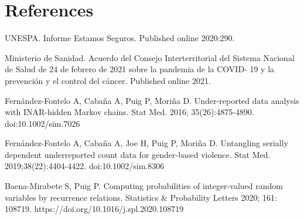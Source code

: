\documentclass[12pt,twoside, A4paper]{article}
\begin{document}


\section*{References}

\begin{description}
\item UNESPA. Informe Estamos Seguros. Published online 2020:290.
\item Ministerio de Sanidad. Acuerdo del Consejo Interterritorial del Sistema
Nacional de Salud de 24 de febrero de 2021 sobre la pandemia de la COVID-
19 y la prevención y el control del cáncer. Published online 2021.
\item Fernández-Fontelo A, Cabaña A, Puig P, Moriña D. Under-reported data
analysis with INAR-hidden Markov chains. Stat Med. 2016; 35(26):4875-4890.
doi:10.1002/sim.7026
\item Fernández-Fontelo A, Cabaña A, Joe H, Puig P, Moriña D. Untangling serially
dependent underreported count data for gender-based violence. Stat Med.
2019;38(22):4404-4422. doi:10.1002/sim.8306
\item Baena-Mirabete S, Puig P. Computing probabilities of integer-valued random variables by recurrence relations. Statistics \& Probability Letters 2020; 161: 108719. https://doi.org/10.1016/j.spl.2020.108719

\end{description}
\end{document}
